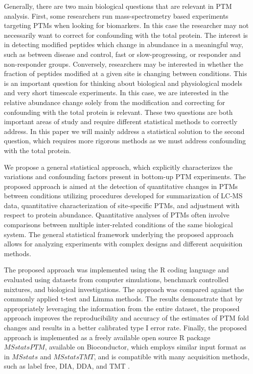 \documentclass[mcp]{article}
\numberwithin{table}{section}
\begin{document}
Generally, there are two main biological questions that are relevant in PTM analysis. First, some researchers run mass-spectrometry based experiments targeting PTMs when looking for biomarkers\cite{Petushkova_2017}. In this case the researcher may not necessarily want to correct for confounding with the total protein. The interest is in detecting modified peptides which change in abundance in a meaningful way, such as between disease and control, fast or slow-progressing, or responder and non-responder groups. Conversely, researchers may be interested in whether the fraction of peptides modified at a given site is changing between conditions. This is an important question for thinking about biological and physiological models and very short timescale experiments. In this case, we are interested in the relative abundance change solely from the modification and correcting for confounding with the total protein is relevant. These two questions are both important areas of study and require different statistical methods to correctly address. In this paper we will mainly address a statistical solution to the second question, which requires more rigorous methods as we must address confounding with the total protein.

We propose a general statistical approach, which explicitly characterizes the variations and confounding factors present in bottom-up PTM experiments. The proposed approach is aimed at the detection of quantitative changes in PTMs between conditions utilizing procedures developed for summarization of LC-MS data, quantitative characterization of site-specific PTMs, and adjustment with respect to protein abundance. Quantitative analyses of PTMs often involve comparisons between multiple inter-related conditions of the same biological system. The general statistical framework underlying the proposed approach allows for analyzing experiments with complex designs and different acquisition methods. 

The proposed approach was implemented using the R coding language and evaluated using datasets from computer simulations, benchmark controlled mixtures, and biological investigations. The approach was compared against the commonly applied t-test and Limma methods\cite{Ritchie_15a}. The results demonstrate that by appropriately leveraging the information from the entire dataset, the proposed approach improves the reproducibility and accuracy of the estimates of PTM fold changes and results in a better calibrated type I error rate. Finally, the proposed approach is implemented as a freely available open source R package $MSstatsPTM$, available on Bioconductor, which employs similar input format as in $MSstats$ and $MSstatsTMT$, and is compatible with many acquisition methods, such as label free, DIA, DDA, and TMT\cite{Choi:2014} \cite{Huang:2020}.
\end{document}
